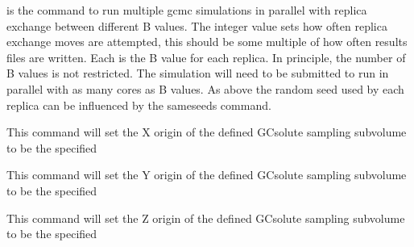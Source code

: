 \documentclass[letterpaper,10pt,english]{sphinxmanual}
\begin{document}
\ignorespaces 
\def\sphinxLiteralBlockLabel{\label{\detokenize{protoms:index-57}}}
%
\begin{sphinxVerbatim}[commandchars=\\\{\}]
    
\end{sphinxVerbatim}

is the command to run multiple gcmc simulations in parallel with replica exchange between different B values. The integer value sets how often replica exchange moves are attempted, this should be some multiple of how often results files are written. Each  is the B value for each replica. In principle, the number of B values is not restricted. The simulation will need to be submitted to run in parallel with as many cores as B values. As above the random seed used by each replica can be influenced by the sameseeds command.

\ignorespaces 
\def\sphinxLiteralBlockLabel{\label{\detokenize{protoms:index-58}}}
%
\begin{sphinxVerbatim}[commandchars=\\\{\}]
 
\end{sphinxVerbatim}

This command will set the X origin of the defined GCsolute sampling subvolume to be the specified 

%
\begin{sphinxVerbatim}[commandchars=\\\{\}]
 
\end{sphinxVerbatim}

This command will set the Y origin of the defined GCsolute sampling subvolume to be the specified 

%
\begin{sphinxVerbatim}[commandchars=\\\{\}]
 
\end{sphinxVerbatim}

This command will set the Z origin of the defined GCsolute sampling subvolume to be the specified 

%
\begin{sphinxVerbatim}[commandchars=\\\{\}]
 
\end{sphinxVerbatim}
\end{document}
